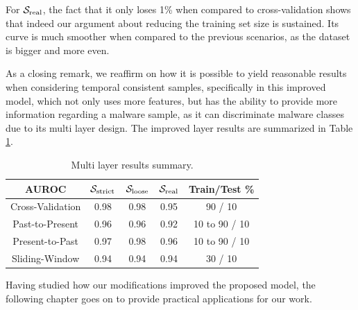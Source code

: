 For $\mathcal{S}_{\mathrm{real}}$, the fact that it only loses 1\% when compared to cross-validation shows that indeed our argument about reducing the training set size is sustained.
Its curve is much smoother when compared to the previous scenarios, as the dataset is bigger and more even.

\medskip

As a closing remark, we reaffirm on how it is possible to yield reasonable results when considering temporal consistent samples, specifically in this improved model, which not only uses more features, but has the ability to provide more information regarding a malware sample, as it can discriminate malware classes due to its multi layer design.
The improved layer results are summarized in Table \ref{tab:multilayer_results}.

\begin{table}[!htb]
	\renewcommand{\arraystretch}{1.2} %
	\centering
	\begin{tabular}{ccccc}
		\toprule
		AUROC & $\mathcal{S}_{\mathrm{strict}}$ & $\mathcal{S}_{\mathrm{loose}}$ & $\mathcal{S}_{\mathrm{real}}$ & Train/Test \%\\
		\midrule
		Cross-Validation & 0.98 & 0.98 & 0.95 & 90 / 10\\
		Past-to-Present & 0.96 & 0.96 & 0.92 & 10 to 90 / 10\\
		Present-to-Past & 0.97 & 0.98 & 0.96 & 10 to 90 / 10\\
		Sliding-Window & 0.94 & 0.94 & 0.94 & 30 / 10\\
		\bottomrule
	\end{tabular}
	\caption{Multi layer results summary.}
	\label{tab:multilayer_results}
\end{table}

Having studied how our modifications improved the proposed model, the following chapter goes on to provide practical applications for our work.